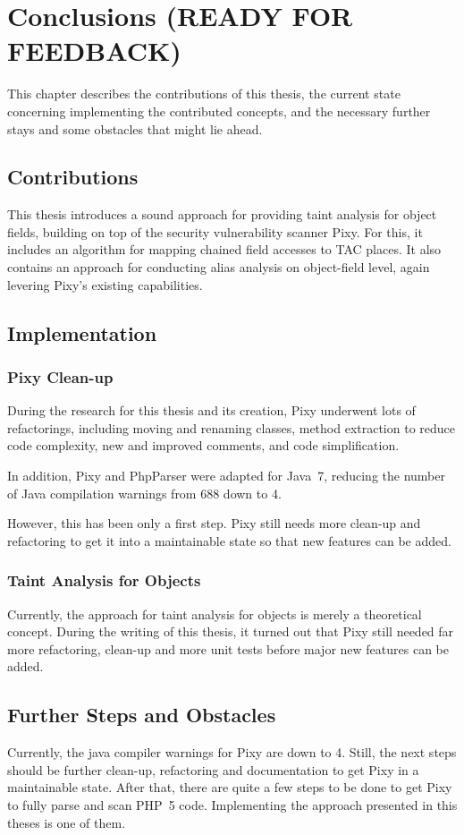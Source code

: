 \chapter{Conclusions (READY FOR FEEDBACK)}
\label{conclusions}

This chapter describes the contributions of this thesis, the current state concerning implementing the contributed concepts, and the necessary further stays and some obstacles that might lie ahead.

\section{Contributions}

This thesis introduces a sound approach for providing taint analysis for object fields, building on top of the security vulnerability scanner Pixy. For this, it includes an algorithm for mapping chained field accesses to TAC places. It also contains an approach for conducting alias analysis on object-field level, again levering Pixy's existing capabilities.


\section{Implementation}

\subsection{Pixy Clean-up}

During the research for this thesis and its creation, Pixy underwent lots of refactorings, including moving and renaming classes, method extraction to reduce code complexity, new and improved comments, and code simplification.

In addition, Pixy and PhpParser were adapted for Java~7, reducing the number of Java compilation warnings from 688 down to 4.

However, this has been only a first step. Pixy still needs more clean-up and refactoring to get it into a maintainable state so that new features can be added.


\subsection{Taint Analysis for Objects}

Currently, the approach for taint analysis for objects is merely a theoretical concept. During the writing of this thesis, it turned out that Pixy still needed far more refactoring, clean-up and more unit tests before major new features can be added.


\section{Further Steps and Obstacles}

Currently, the java compiler warnings for Pixy are down to 4. Still, the next steps should be further clean-up, refactoring and documentation to get Pixy in a maintainable state. After that, there are quite a few steps to be done to get Pixy to fully parse and scan PHP~5 code. Implementing the approach presented in this theses is one of them.
